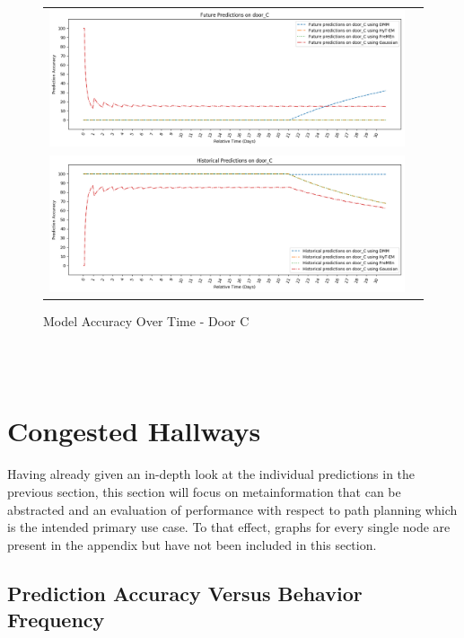 \begin{center}
\begin{figure}[!Hp]
  \begin{tabular}{cc}
    {\includegraphics[width = 6in]{images/results/Future_Predictions_on_door_C.png}} \\
    {\includegraphics[width = 6in]{images/results/Historical_Predictions_on_door_C.png}} \\
  \end{tabular}
  \caption{Model Accuracy Over Time - Door C}
  \label{figure:accuracy_door_C}
\end{figure}\\ \\
\end{center}


\section{ Congested Hallways }

Having already given an in-depth look at the individual predictions in the
previous section, this section will
focus on metainformation that can be abstracted and
an evaluation of performance with respect to path planning which is the intended primary use case.
To that effect, graphs for every single node are present in the appendix but
have not been included in this section.

\subsection{ Prediction Accuracy Versus Behavior Frequency }


